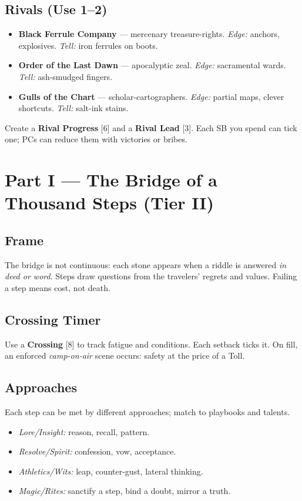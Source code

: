 \documentclass[11pt]{article}
\newcommand{\Clock}[2]{\textbf{#1} [#2]}
\begin{document}
\subsection*{Rivals (Use 1--2)}
\begin{itemize}
\item \textbf{Black Ferrule Company} --- mercenary treasure-rights. \emph{Edge:} anchors, explosives. \emph{Tell:} iron ferrules on boots.
\item \textbf{Order of the Last Dawn} --- apocalyptic zeal. \emph{Edge:} sacramental wards. \emph{Tell:} ash-smudged fingers.
\item \textbf{Gulls of the Chart} --- scholar-cartographers. \emph{Edge:} partial maps, clever shortcuts. \emph{Tell:} salt-ink stains.
\end{itemize}
Create a \Clock{Rival Progress}{6} and a \Clock{Rival Lead}{3}. Each SB you spend can tick one; PCs can reduce them with victories or bribes.

\section*{Part I --- The Bridge of a Thousand Steps (Tier II)}

\subsection*{Frame}
The bridge is not continuous: each stone appears when a riddle is answered \emph{in deed or word}. Steps draw questions from the travelers' regrets and values. Failing a step means cost, not death.

\subsection*{Crossing Timer }
Use a \Clock{Crossing}{8} to track fatigue and conditions. Each setback ticks it. On fill, an enforced \emph{camp-on-air} scene occurs: safety at the price of a Toll.

\subsection*{Approaches}
Each step can be met by different approaches; match to playbooks and talents.
\begin{itemize}
\item \emph{Lore/Insight:} reason, recall, pattern. 
\item \emph{Resolve/Spirit:} confession, vow, acceptance.
\item \emph{Athletics/Wits:} leap, counter-gust, lateral thinking.
\item \emph{Magic/Rites:} sanctify a step, bind a doubt, mirror a truth.
\end{itemize}
\end{document}
